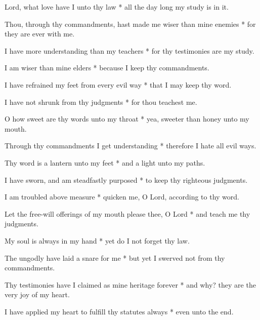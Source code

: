 Lord, what love have I unto thy law * all the day long my study is in it.

Thou, through thy commandments, hast made me wiser than mine enemies * for they are ever with me.

I have more understanding than my teachers * for thy testimonies are my study.

I am wiser than mine elders * because I keep thy commandments.

I have refrained my feet from every evil way * that I may keep thy word.

I have not shrunk from thy judgments * for thou teachest me.

O how sweet are thy words unto my throat * yea, sweeter than honey unto my mouth.

Through thy commandments I get understanding * therefore I hate all evil ways.

Thy word is a lantern unto my feet * and a light unto my paths.

I have sworn, and am steadfastly purposed * to keep thy righteous judgments.

I am troubled above measure * quicken me, O Lord, according to thy word.

Let the free-will offerings of my mouth please thee, O Lord * and teach me thy judgments.

My soul is always in my hand * yet do I not forget thy law.

The ungodly have laid a snare for me * but yet I swerved not from thy commandments.

Thy testimonies have I claimed as mine heritage forever * and why? they are the very joy of my heart.

I have applied my heart to fulfill thy statutes always * even unto the end.